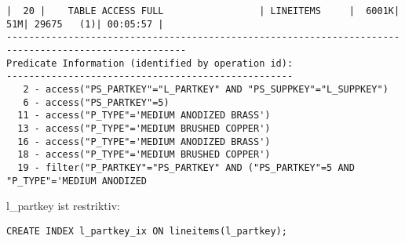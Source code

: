 \documentclass[10pt]{article}
\begin{document}
\begin{lstlisting}[style=queryexecutionplan]
|  20 |    TABLE ACCESS FULL                 | LINEITEMS     |  6001K|    51M| 29675   (1)| 00:05:57 |
------------------------------------------------------------------------------------------------------
Predicate Information (identified by operation id):
---------------------------------------------------
   2 - access("PS_PARTKEY"="L_PARTKEY" AND "PS_SUPPKEY"="L_SUPPKEY")
   6 - access("PS_PARTKEY"=5)
  11 - access("P_TYPE"='MEDIUM ANODIZED BRASS')
  13 - access("P_TYPE"='MEDIUM BRUSHED COPPER')
  16 - access("P_TYPE"='MEDIUM ANODIZED BRASS')
  18 - access("P_TYPE"='MEDIUM BRUSHED COPPER')
  19 - filter("P_PARTKEY"="PS_PARTKEY" AND ("PS_PARTKEY"=5 AND "P_TYPE"='MEDIUM ANODIZED 
\end{lstlisting}

l\_partkey ist restriktiv:
\begin{lstlisting}[style=sql]
CREATE INDEX l_partkey_ix ON lineitems(l_partkey);
\end{lstlisting}
\end{document}
